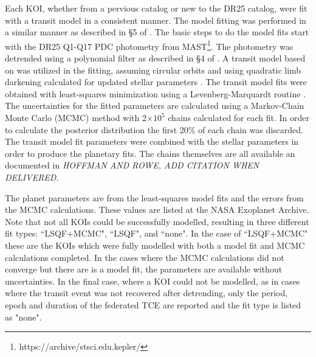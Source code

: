 \label{s:mcmc}

Each KOI, whether from a pervious catalog or new to the DR25 catalog, were fit with a transit model in a consistent manner. The model fitting was performed in a similar manner as described in \S5 of \citet{Rowe2015cat}. The basic steps to do the model fits start with the DR25 Q1-Q17 PDC photometry from MAST\footnote{https://archive/stsci.edu.kepler/}. The photometry was detrended using a polynomial filter as described in \S4 of \citet{Rowe2014}. A transit model based on \citet{Mandel2002} was utilized in the fitting, assuming circular orbits and using quadratic limb darkening \citep{Claret2011} calculated for updated stellar parameters \citep{Mathur2017}. The transit model fits were obtained with least-squares minimization using a Levenberg-Marquardt routine \citep{More1980}. The uncertainties for the fitted parameters are calculated using a Markov-Chain Monte Carlo (MCMC) method \citep{Ford2005AJ} with 2$\times 10^{5}$ chains calculated for each fit. In order to calculate the posterior distribution the first 20\% of each chain was discarded. The transit model fit parameters were combined with the stellar parameters in order to produce the planetary fits. The chains themselves are all available an documented in {\it HOFFMAN AND ROWE, ADD CITATION WHEN DELIVERED}. 

The planet parameters are from the least-squares model fits and the errors from the MCMC calculations. These values are listed at the NASA Exoplanet Archive. Note that not all KOIs could be successfully modelled, resulting in three different fit types: ``LSQF+MCMC", ``LSQF", and ``none". In the case of ``LSQF+MCMC" these are the KOIs which were fully modelled with both a model fit and MCMC calculations completed. In the cases where the MCMC calculations did not converge but there are is a model fit, the parameters are available without uncertainties. In the final case, where a KOI could not be modelled, as in cases where the transit event was not recovered after detrending, only the period, epoch and duration of the federated TCE are reported and the fit type is listed as "none".